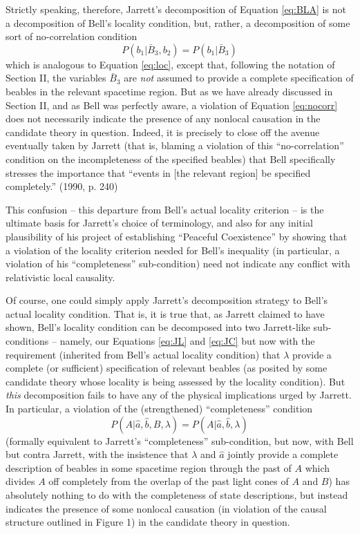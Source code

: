 \documentclass[aps,prc,twocolumn]{revtex4}
\begin{document}
Strictly speaking,
therefore, Jarrett's decomposition of Equation \ref{eq:BLA}
is not a decomposition of
Bell's locality condition, but, rather, a decomposition of some sort of
no-correlation condition 
\begin{equation}
P(b_1 | \bar{B}_3, b_2) = P(b_1 | \bar{B}_3)
\label{eq:nocorr}
\end{equation}
which is analogous to Equation \ref{eq:loc}, except that, following
the notation of Section II, the variables $\bar{B}_3$ are \emph{not} 
assumed to provide a complete specification of
beables in the relevant spacetime region.  But as we have already
discussed in Section II, and as Bell was perfectly aware,
a violation of Equation \ref{eq:nocorr} does
not necessarily indicate the presence of any nonlocal causation in the
candidate theory in question.  Indeed, it is precisely to close off the
avenue eventually taken by Jarrett (that is, blaming a violation of this
``no-correlation'' condition on the incompleteness of the specified
beables) that Bell specifically stresses the importance that ``events
in [the relevant region] be specified completely.'' (1990, p. 240)


This confusion -- this departure from Bell's
actual locality criterion -- is the ultimate basis for Jarrett's
choice of terminology, and also for any initial plausibility of his
project of establishing ``Peaceful Coexistence'' by showing that a
violation of the locality criterion needed for Bell's inequality (in
particular, a violation of his ``completeness'' sub-condition) need
not indicate any conflict with relativistic local causality. 

Of course, one could simply apply Jarrett's decomposition strategy to
Bell's actual locality condition.  That is, it is true that, as
Jarrett claimed to have shown, Bell's locality condition can be
decomposed into two Jarrett-like sub-conditions -- namely, our
Equations \ref{eq:JL} and \ref{eq:JC} but now with the requirement
(inherited from Bell's actual locality condition) that $\lambda$ 
provide a complete (or sufficient) specification of relevant beables
(as posited by some candidate theory whose locality is being assessed
by the locality condition).  
But \emph{this} decomposition fails to have any of the physical
implications urged by Jarrett.  In particular, a violation of the
(strengthened) ``completeness'' condition 
\begin{equation}
P(A|\hat{a},\hat{b},B,\lambda) = P(A|\hat{a},\hat{b},\lambda)
\label{eq:BJcomp2}
\end{equation}
(formally equivalent to Jarrett's ``completeness'' sub-condition, but now,
with Bell but contra Jarrett, with the insistence that $\lambda$ and 
$\hat{a}$ jointly provide a complete description of beables in some
spacetime region through the past of $A$ which divides $A$ off
completely from the overlap of the past light cones of $A$ and $B$)
has absolutely nothing to do with the completeness of state descriptions,
but instead indicates the
presence of some nonlocal causation (in violation of the causal
structure outlined in Figure 1) in the candidate theory in question.
\end{document}
